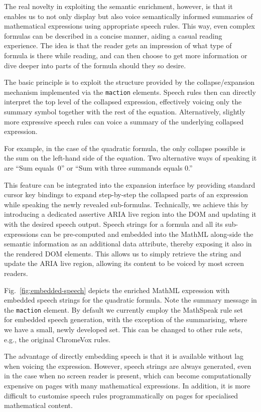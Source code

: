 \documentclass[conference]{IEEEtran}
\begin{document}
The real novelty in exploiting the semantic enrichment, however, is that it
enables us to not only display but also voice semantically informed summaries of
mathematical expressions using appropriate speech rules. This way, even complex
formulas can be described in a concise manner, aiding a casual reading
experience. The idea is that the reader gets an impression of what type of formula
is there while reading, and can then choose to get more information or dive
deeper into parts of the formula should they so desire.

The basic principle is to exploit the structure provided by the
collapse/expansion mechanism implemented via the \texttt{maction}
elements. Speech rules then can directly interpret the top level of the
collapsed expression, effectively voicing only the summary symbol together with
the rest of the equation. Alternatively, slightly more expressive speech rules
can voice a summary of the underlying collapsed expression.

For example, in the case of the quadratic formula, the only collapse possible is
the sum on the left-hand side of the equation. Two alternative ways of speaking
it are ``Sum equals~0'' or ``Sum with three summands equals 0.''

This feature can be integrated into the expansion interface by providing
standard cursor key bindings to expand step-by-step the collapsed parts
of an expression while speaking the newly revealed sub-formulas.  Technically, we
achieve this by introducing a dedicated assertive ARIA live region into the DOM
and updating it with the desired speech output. Speech strings for a formula and
all its sub-expressions can be pre-computed and embedded
into the MathML along-side the semantic information as an additional data
attribute, thereby exposing it also in the rendered DOM elements. This allows us
to simply retrieve the string and update the ARIA live region, allowing
its content to be voiced by most screen readers.

Fig.~\ref{fig:embedded-speech} depicts the enriched MathML expression with
embedded speech strings for the quadratic formula. Note the summary
message in the \texttt{maction} element. By default we currently employ the
MathSpeak rule set~\cite{MathSpeak} for embedded speech generation, with the
exception of the summarising, where we have a small, newly developed
set. This can be changed to other rule sets, e.g., the
original ChromeVox rules.

The advantage of directly embedding speech is that it is available without lag
when voicing the expression. However, speech strings are always generated, even
in the case when no screen reader is present, which can become computationally
expensive on pages with many mathematical expressions. In addition, it is more
difficult to customise speech rules programmatically on pages for specialised
mathematical content.
\end{document}
